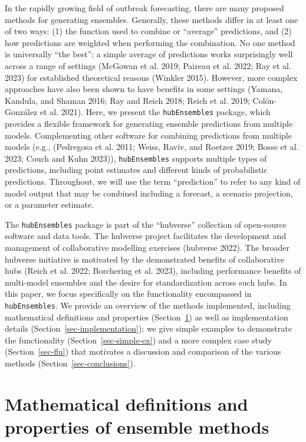 \documentclass[
]{article}
\begin{document}
In the rapidly growing field of outbreak forecasting, there are many
proposed methods for generating ensembles. Generally, these methods
differ in at least one of two ways: (1) the function used to combine or
``average'' predictions, and (2) how predictions are weighted when
performing the combination. No one method is universally ``the best''; a
simple average of predictions works surprisingly well across a range of
settings (McGowan et al. 2019; Paireau et al. 2022; Ray et al. 2023) for
established theoretical reasons (Winkler 2015). However, more complex
approaches have also been shown to have benefits in some settings
(Yamana, Kandula, and Shaman 2016; Ray and Reich 2018; Reich et al.
2019; Colón-González et al. 2021). Here, we present the
\texttt{hubEnsembles} package, which provides a flexible framework for
generating ensemble predictions from multiple models. Complementing
other software for combining predictions from multiple models (e.g.,
(Pedregosa et al. 2011; Weiss, Raviv, and Roetzer 2019; Bosse et al.
2023; Couch and Kuhn 2023)), \texttt{hubEnsembles} supports multiple
types of predictions, including point estimates and different kinds of
probabilistic predictions. Throughout, we will use the term
``prediction'' to refer to any kind of model output that may be combined
including a forecast, a scenario projection, or a parameter estimate.

The \texttt{hubEnsembles} package is part of the ``hubverse'' collection
of open-source software and data tools. The hubverse project facilitates
the development and management of collaborative modelling exercises
(hubverse 2022). The broader hubverse initiative is motivated by the
demonstrated benefits of collaborative hubs (Reich et al. 2022;
Borchering et al. 2023), including performance benefits of multi-model
ensembles and the desire for standardization across such hubs. In this
paper, we focus specifically on the functionality encompassed in
\texttt{hubEnsembles}. We provide an overview of the methods
implemented, including mathematical definitions and properties
(Section~\ref{sec-defs}) as well as implementation details
(Section~\ref{sec-implementation}); we give simple examples to
demonstrate the functionality (Section~\ref{sec-simple-ex}) and a more
complex case study (Section~\ref{sec-flu}) that motivates a discussion
and comparison of the various methods (Section~\ref{sec-conclusions}).

\section{Mathematical definitions and properties of ensemble
methods}\label{sec-defs}
\end{document}
